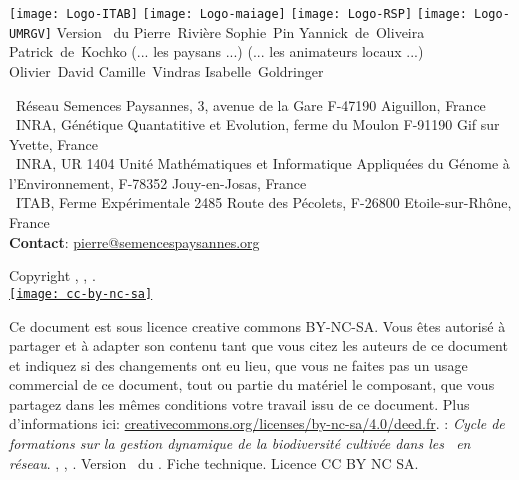 \begin{center}
\texttt{[image: Logo-ITAB]}
\hspace{1cm}
\texttt{[image: Logo-maiage]}
\hspace{1cm}
\texttt{[image: Logo-RSP]}
\hspace{1cm}
\texttt{[image: Logo-UMRGV]}
\vfill
\Large {}
\vfill
\large
Version \versionCF~du \dateversionCF
\vfill
\normalsize
Pierre~Rivière \hspace{.5cm}
Sophie~Pin \hspace{.5cm}
Yannick~de~Oliveira \hspace{.5cm}
Patrick~de~Kochko \hspace{.5cm}
(... les paysans ...) \hspace{.5cm}
(... les animateurs locaux ...) \hspace{.5cm}
Olivier~David \hspace{.5cm}
Camille~Vindras \hspace{.5cm}
Isabelle~Goldringer \\
\small
\end{center}
\noindent{}~Réseau Semences Paysannes, 3, avenue de la Gare F-47190 Aiguillon, France \\
\noindent{}~INRA, Génétique Quantatitive et Evolution, ferme du Moulon F-91190 Gif sur Yvette, France \\
\noindent{}~INRA, UR 1404 Unité Mathématiques et Informatique Appliquées du Génome à l'Environnement, F-78352 Jouy-en-Josas, France \\
\noindent{}~ITAB, Ferme Expérimentale 2485 Route des Pécolets, F-26800 Etoile-sur-Rhône, France \\
\noindent\up{*} \textbf{Contact}: \href{mailto:pierre@semencespaysannes.org}{\textcolor{mln-green} {pierre@semencespaysannes.org}}
\normalsize
\vfill
\begin{center}
Copyright \RSP, \INRA, \ITAB.
~\\
\href{http://creativecommons.org/licenses/by-nc-sa/4.0/deed.fr}{\texttt{[image: cc-by-nc-sa]}}
\end{center}
\small
Ce document est sous licence creative commons BY-NC-SA.
Vous êtes autorisé à partager et à adapter son contenu tant 
que vous citez les auteurs de ce document et indiquez si des changements ont eu lieu, 
que vous ne faites pas un usage commercial de ce document, tout ou partie du matériel le composant,
que vous partagez dans les mêmes conditions votre travail issu de ce document. 
Plus d'informations ici: \url{creativecommons.org/licenses/by-nc-sa/4.0/deed.fr}.
\vfill
{}:
\textit{
Cycle de formations sur la gestion dynamique de la biodiversité cultivée dans les \MSPs~en réseau}.
\RSP, \INRA, \ITAB.
Version \versionCF~du \dateversionCF.
Fiche technique.
Licence CC BY NC SA.

